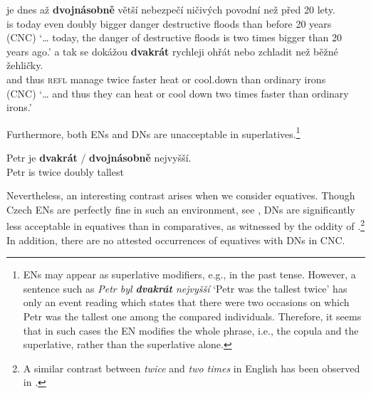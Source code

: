 \documentclass[output=paper,modfonts,hidelinks,newtxmath
\ChapterDOI{10.5281/zenodo.2545513}
]{langscibook}
\begin{document}
\ea\label{comparatives-cnc} \ea \gll {\ldots} je dnes až \textbf{dvojnásobně} větší nebezpečí ničivých
povodní než před 20 lety.\\
{} is today even doubly bigger danger destructive floods than before 20
years\\\hfill(CNC)
\glt `{\dots} today, the danger of destructive floods is two times bigger than 20
years ago.'
\ex \gll {\dots} a tak se dokážou \textbf{dvakrát} rychleji ohřát nebo zchladit než
běžné žehličky.\\
{} and thus \textsc{refl} manage twice faster heat or cool.down than ordinary
irons\\\hfill(CNC)
\glt `{\dots} and thus they can heat or cool down two times faster than ordinary
irons.'
\z
\z

\noindent Furthermore, both ENs and DNs are unacceptable in superlatives.\footnote{ENs may appear as superlative modifiers, e.g., in the past tense. However, a sentence such as \textit{Petr byl \textbf{dvakrát} nejvyšší} `Petr was the tallest twice' has only an event reading which states that there were two occasions on which Petr was the tallest one among the compared individuals. Therefore, it seems that in such cases the EN modifies the whole phrase, i.e., the copula and the superlative, rather than the superlative alone.}

\ea *\gll Petr je \textbf{dvakrát} / \textbf{dvojnásobně} nejvyšší.\\
Petr is twice {} doubly tallest\\
\z

\noindent Nevertheless, an interesting contrast arises when we consider equatives. Though Czech ENs are perfectly fine in such an environment, see , DNs are significantly less acceptable in equatives than in comparatives, as witnessed by the oddity of .\footnote{A similar contrast between \textit{twice} and \textit{two times} in English has been observed in \cite{gobeski2011twice}.} In addition, there are no attested occurrences of equatives with DNs in CNC.

\ea\label{dvakrat-comp-eq} 
\z \z
\end{document}
